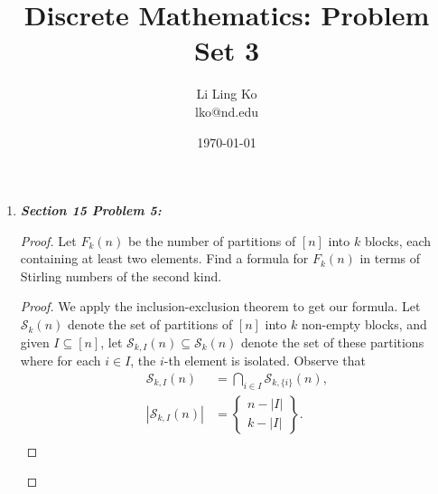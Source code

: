 \documentclass{article}
\begin{document}
\title{Discrete Mathematics: Problem Set 3}
\author{Li Ling Ko\\ lko@nd.edu}
\date{\today}
\maketitle

\begin{enumerate}[label={\bf Q\arabic*:}]
  \item \it \textbf{Section 15 Problem 5:}
    \begin{proof}
      Let $F_k(n)$ be the number of partitions of $[n]$ into $k$ blocks,
      each containing at least two elements. Find a formula for $F_k(n)$ in
      terms of Stirling numbers of the second kind.

      \begin{proof}
        We apply the inclusion-exclusion theorem to get our formula.
        Let $\mathcal{S}_k(n)$ denote the set of partitions of $[n]$ into
        $k$ non-empty blocks, and given $I\subseteq[n]$, let
        $\mathcal{S}_{k,I}(n)\subseteq \mathcal{S}_k(n)$ denote the set of
        these partitions where for each $i\in I$, the $i$-th element is
        isolated. Observe that
        \begin{align*}
          \mathcal{S}_{k,I}(n) &=\bigcap_{i\in I} \mathcal{S}_{k,\{i\}}(n),\\
          |\mathcal{S}_{k,I}(n)| &=
            \begin{Bmatrix}n-|I|\\k-|I|\end{Bmatrix}.\\
        \end{align*}


\end{proof}
\end{proof}
\end{enumerate}
\end{document}
